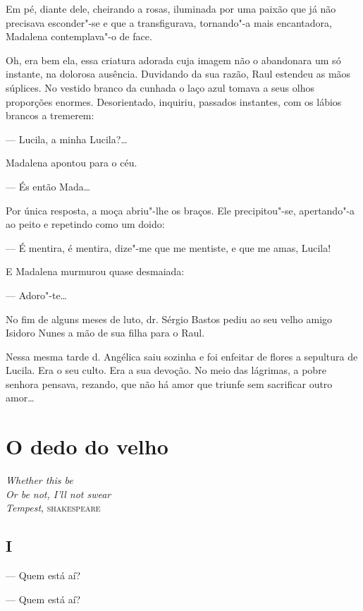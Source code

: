 Em pé, diante dele, cheirando a rosas, iluminada por uma paixão que já
não precisava esconder"-se e que a transfigurava, tornando"-a mais
encantadora, Madalena contemplava"-o de face.

Oh, era bem ela, essa criatura adorada cuja imagem não o abandonara um
só instante, na dolorosa ausência. Duvidando da sua razão, Raul estendeu
as mãos súplices. No vestido branco da cunhada o laço azul tomava a seus
olhos proporções enormes. Desorientado, inquiriu, passados instantes,
com os lábios brancos a tremerem:

--- Lucila, a minha Lucila?\ldots{}

Madalena apontou para o céu.

--- És então Mada\ldots{}

Por única resposta, a moça abriu"-lhe os braços. Ele precipitou"-se,
apertando"-a ao peito e repetindo como um doido:

--- É mentira, é mentira, dize"-me que me mentiste, e que me amas,
Lucila!

E Madalena murmurou quase desmaiada:

--- Adoro"-te\ldots{}

\asterisc

No fim de alguns meses de luto, dr. Sérgio Bastos pediu ao seu velho
amigo Isidoro Nunes a mão de sua filha para o Raul.

Nessa mesma tarde d. Angélica saiu sozinha e foi enfeitar de flores a
sepultura de Lucila. Era o seu culto. Era a sua devoção. No meio das
lágrimas, a pobre senhora pensava, rezando, que não há amor que triunfe
sem sacrificar outro amor\ldots{}

\chapter{O dedo do velho}

\begin{flushright}
\small\textit{Whether this be\\
Or be not, I'll not swear}\\\emph{Tempest}, \textsc{shakespeare}
\end{flushright}

\section{I}

--- Quem está aí?

--- Quem está aí?

